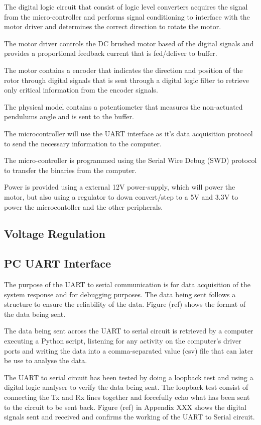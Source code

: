 \documentclass[a4paper,12pt]{article}
\begin{document}
	The digital logic circuit that consist of logic level converters acquires the signal from the micro-controller and performs signal conditioning to interface with the motor driver and determines the correct direction to rotate the motor. 
	
	The motor driver controls the DC brushed motor based of the digital signals and provides a proportional feedback current that is fed/deliver to buffer.
	
	The motor contains a encoder that indicates the direction and position of the rotor through digital signals that is sent through a digital logic filter to retrieve only critical information from the encoder signals. 
	
	The physical model contains a potentiometer that measures the non-actuated pendulums angle and is sent to the buffer.
	
	The microcontroller will use the UART interface as it's data acquisition protocol to send the necessary information to the computer. 
	
	The micro-controller is programmed using the Serial Wire Debug (SWD) protocol to transfer the binaries from the computer.
	
	Power is provided using a external 12V power-supply, which will power the motor, but also using a regulator to down convert/step to a 5V and 3.3V to power the microcontoller and the other peripherals.
	
	\subsection{Voltage Regulation}
	
	\subsection{PC UART Interface }
	
	The purpose of the UART to serial communication is for data acquisition of the system response and for debugging purposes. The data being sent follows a structure to ensure the reliability of the data. Figure (ref) shows the format of the data being sent.
	
	The data being sent across the UART to serial circuit is retrieved by a computer executing a Python script, listening for any activity on the computer's driver ports and writing the data into a comma-separated value (csv) file that can later be use to analyse the data.
	
	
	The UART to serial circuit has been tested by doing a loopback test and using a digital logic analyser to verify the data being sent. The loopback test consist of connecting the Tx and Rx lines together and forcefully echo what has been sent to the circuit to be sent back. Figure (ref) in Appendix XXX shows the digital signals sent and received and confirms the working of the UART to Serial circuit.
	
\end{document}
